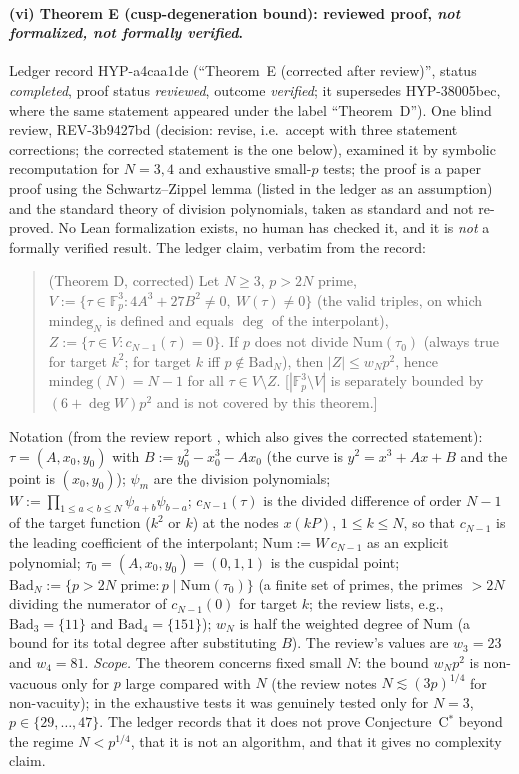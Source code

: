 \documentclass[11pt,a4paper]{article}
\theoremstyle{remark}
\begin{document}
\paragraph{(vi) Theorem E (cusp-degeneration bound): reviewed proof, \emph{not formalized, not formally verified}.}
Ledger record \mbox{HYP-a4caa1de} (``Theorem~E (corrected after review)'', status \emph{completed}, proof status \emph{reviewed}, outcome \emph{verified}; it supersedes \mbox{HYP-38005bec}, where the same statement appeared under the label ``Theorem~D''). One blind review, \mbox{REV-3b9427bd} (decision: revise, i.e.\ accept with three statement corrections; the corrected statement is the one below),
examined it by symbolic recomputation for $N=3,4$ and exhaustive small-$p$ tests; the proof is a paper proof using the Schwartz--Zippel lemma (listed in the ledger as an assumption) and the standard theory of division polynomials, taken as standard and not re-proved. No Lean formalization exists, no human has checked it,
and it is \emph{not} a formally verified result. The ledger claim, verbatim from the record:
\begin{quote}\small
(Theorem D, corrected) Let $N\ge3$, $p>2N$ prime, $V:=\{\tau\in\mathbb F_p^3: 4A^3+27B^2\ne0,\ W(\tau)\ne0\}$ (the valid triples, on which $\mathrm{mindeg}_N$ is defined and equals $\deg$ of the interpolant), $Z:=\{\tau\in V: c_{N-1}(\tau)=0\}$.
If $p$ does not divide $\mathrm{Num}(\tau_0)$ (always true for target $k^2$; for target $k$ iff $p\notin\mathrm{Bad}_N$), then $|Z|\le w_Np^2$, hence $\mathrm{mindeg}(N)=N-1$ for all $\tau\in V\setminus Z$.
[$|\mathbb F_p^3\setminus V|$ is separately bounded by $(6+\deg W)p^2$ and is not covered by this theorem.]
\end{quote}
Notation (from the review report , which also gives the corrected statement): $\tau=(A,x_0,y_0)$ with $B:=y_0^2-x_0^3-Ax_0$ (the curve is $y^2=x^3+Ax+B$ and the point is $(x_0,y_0)$);
$\psi_m$ are the division polynomials; $W:=\prod_{1\le a<b\le N}\psi_{a+b}\psi_{b-a}$; $c_{N-1}(\tau)$ is the divided difference of order $N-1$ of the target function ($k^2$ or $k$) at the nodes $x(kP)$, $1\le k\le N$, so that $c_{N-1}$ is the leading coefficient of the interpolant;
$\mathrm{Num}:=W\,c_{N-1}$ as an explicit polynomial; $\tau_0=(A,x_0,y_0)=(0,1,1)$ is the cuspidal point; $\mathrm{Bad}_N:=\{p>2N \text{ prime}: p\mid \mathrm{Num}(\tau_0)\}$ (a finite set of primes, the primes $>2N$ dividing the numerator of $c_{N-1}(0)$ for target $k$;
the review lists, e.g., $\mathrm{Bad}_3=\{11\}$ and $\mathrm{Bad}_4=\{151\}$); $w_N$ is half the weighted degree of $\mathrm{Num}$ (a bound for its total degree after substituting $B$). The review's values are $w_3=23$ and $w_4=81$.
\emph{Scope.} The theorem concerns fixed small $N$: the bound $w_Np^2$ is non-vacuous only for $p$ large compared with $N$ (the review notes $N\lesssim(3p)^{1/4}$ for non-vacuity); in the exhaustive tests it was genuinely tested only for $N=3$, $p\in\{29,\dots,47\}$. The ledger records that it does not prove
Conjecture~C$^*$ beyond the regime $N<p^{1/4}$, that it is not an algorithm, and that it gives no complexity claim.
\end{document}
